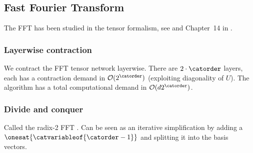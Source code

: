 \subsection{Fast Fourier Transform}

The FFT has been studied in the tensor formalism, see \cite{dolgov_superfast_2012} and Chapter~14 in \cite{hackbusch_tensor_2012}.

\subsubsection{Layerwise contraction}

We contract the FFT tensor network layerwise.
There are $2\cdot \catorder$ layers, each has a contraction demand in $\mathcal{O}(2^{\catorder})$ (exploiting diagonality of $U$).
The algorithm has a total computational demand in $\mathcal{O}(d2^{\catorder})$.

\subsubsection{Divide and conquer}

Called the radix-2 FFT \cite{cooley_algorithm_1965}.
Can be seen as an iterative simplification by adding a $\onesat{\catvariableof{\catorder-1}}$ and splitting it into the basis vectors.


